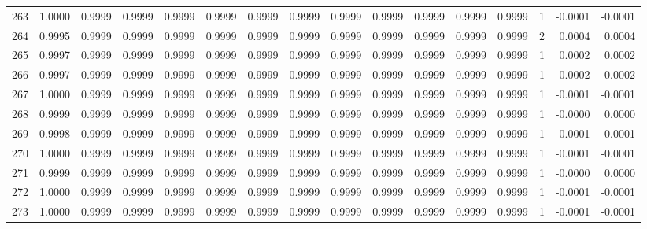 \begin{tabular}{lrrrrrrrrrrrrrrr}
263 &      1.0000 &  0.9999 &  0.9999 &  0.9999 &  0.9999 &  0.9999 &  0.9999 &  0.9999 &  0.9999 &  0.9999 &   0.9999 &     0.9999 &      1 &                   -0.0001 &                    -0.0001 \\
264 &      0.9995 &  0.9999 &  0.9999 &  0.9999 &  0.9999 &  0.9999 &  0.9999 &  0.9999 &  0.9999 &  0.9999 &   0.9999 &     0.9999 &      2 &                    0.0004 &                     0.0004 \\
265 &      0.9997 &  0.9999 &  0.9999 &  0.9999 &  0.9999 &  0.9999 &  0.9999 &  0.9999 &  0.9999 &  0.9999 &   0.9999 &     0.9999 &      1 &                    0.0002 &                     0.0002 \\
266 &      0.9997 &  0.9999 &  0.9999 &  0.9999 &  0.9999 &  0.9999 &  0.9999 &  0.9999 &  0.9999 &  0.9999 &   0.9999 &     0.9999 &      1 &                    0.0002 &                     0.0002 \\
267 &      1.0000 &  0.9999 &  0.9999 &  0.9999 &  0.9999 &  0.9999 &  0.9999 &  0.9999 &  0.9999 &  0.9999 &   0.9999 &     0.9999 &      1 &                   -0.0001 &                    -0.0001 \\
268 &      0.9999 &  0.9999 &  0.9999 &  0.9999 &  0.9999 &  0.9999 &  0.9999 &  0.9999 &  0.9999 &  0.9999 &   0.9999 &     0.9999 &      1 &                   -0.0000 &                     0.0000 \\
269 &      0.9998 &  0.9999 &  0.9999 &  0.9999 &  0.9999 &  0.9999 &  0.9999 &  0.9999 &  0.9999 &  0.9999 &   0.9999 &     0.9999 &      1 &                    0.0001 &                     0.0001 \\
270 &      1.0000 &  0.9999 &  0.9999 &  0.9999 &  0.9999 &  0.9999 &  0.9999 &  0.9999 &  0.9999 &  0.9999 &   0.9999 &     0.9999 &      1 &                   -0.0001 &                    -0.0001 \\
271 &      0.9999 &  0.9999 &  0.9999 &  0.9999 &  0.9999 &  0.9999 &  0.9999 &  0.9999 &  0.9999 &  0.9999 &   0.9999 &     0.9999 &      1 &                   -0.0000 &                     0.0000 \\
272 &      1.0000 &  0.9999 &  0.9999 &  0.9999 &  0.9999 &  0.9999 &  0.9999 &  0.9999 &  0.9999 &  0.9999 &   0.9999 &     0.9999 &      1 &                   -0.0001 &                    -0.0001 \\
273 &      1.0000 &  0.9999 &  0.9999 &  0.9999 &  0.9999 &  0.9999 &  0.9999 &  0.9999 &  0.9999 &  0.9999 &   0.9999 &     0.9999 &      1 &                   -0.0001 &                    -0.0001 \\

\end{tabular}
